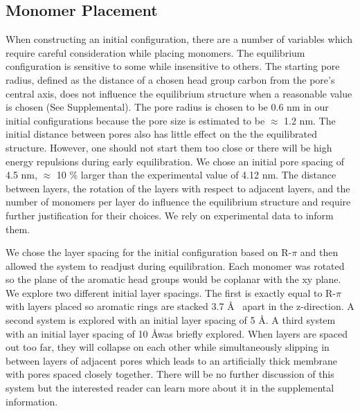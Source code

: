 \documentclass{article}
\newcommand{\angstrom}{\textup{\AA}}
\begin{document}
\subsection{Monomer Placement} 

  When constructing an initial configuration, there are a number of variables
  which require careful consideration while placing monomers. The equilibrium
  configuration is sensitive to some while insensitive to others. The starting
  pore radius, defined as the distance of a chosen head group carbon from the
  pore's central axis, does not influence the equilibrium structure when a
  reasonable value is chosen (See Supplemental). The pore radius is chosen to be
  0.6 nm in our initial configurations because the pore size is estimated to be
  $\approx$ 1.2 nm. The initial distance between pores also has little effect on
  the the equilibrated structure. However, one should not start them too close or
  there will be high energy repulsions during early equilibration. We chose an
  initial pore spacing of 4.5 nm, $\approx$ 10 \% larger than the experimental
  value of 4.12 nm.  The distance between layers, the rotation of the layers with
  respect to adjacent layers, and the number of monomers per layer do influence
  the equilibrium structure and require further justification for their choices.
  We rely on experimental data to inform them. 

  We chose the layer spacing for the initial configuration based on R-$\pi$ and
  then allowed the system to readjust during equilibration. Each monomer was rotated
  so the plane of the aromatic head groups would be coplanar with the xy plane.
  We explore two different initial layer spacings. The first is exactly equal to
  R-$\pi$ with layers placed so aromatic rings are stacked 3.7 \angstrom~ apart
  in the z-direction. A second system is explored with an initial layer spacing
  of 5 \angstrom. A third system with an initial layer spacing of 10 \angstrom was
  briefly explored. When layers are spaced out too far, they will collapse
  on each other while simultaneously slipping in between layers of adjacent pores
  which leads to an artificially thick membrane with pores spaced closely
  together. There will be no further discussion of this system but the interested
  reader can learn more about it in the supplemental information.
\end{document}

